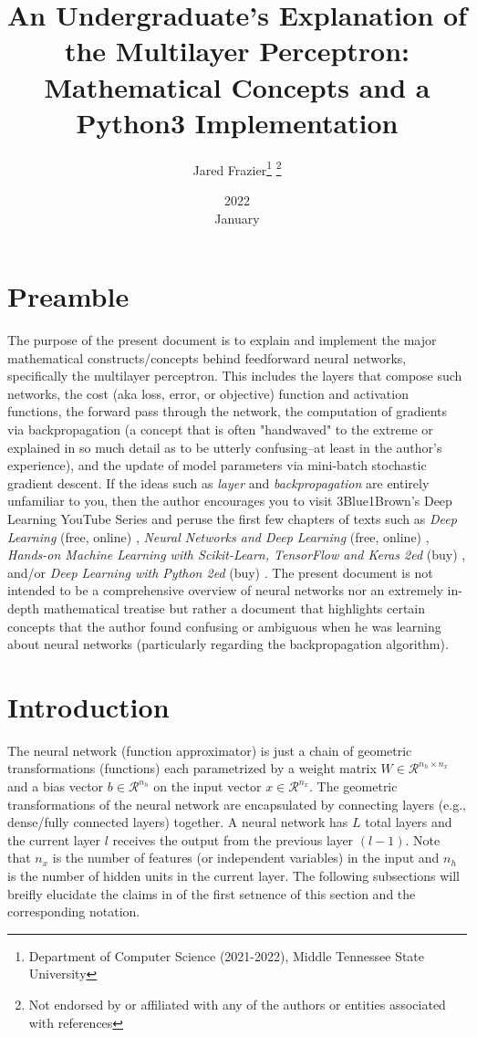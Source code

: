 \documentclass{article}
\title{
	An Undergraduate's Explanation of the Multilayer Perceptron: 
	Mathematical Concepts and a Python3 Implementation}
\date{2022 \\ January}
\author{Jared Frazier\thanks{Department of Computer Science (2021-2022), 
Middle Tennessee State University} \thanks{Not endorsed by or affiliated with any of the 
authors or entities associated with references}}
\begin{document}
\maketitle

\section{Preamble}
\quad The purpose of the present document is to explain and implement the major mathematical
constructs/concepts behind feedforward neural networks, specifically the multilayer perceptron.
This includes the layers that compose such networks, the cost (aka loss, error, or objective) function
and activation functions, the forward pass through the network,
the computation of gradients via backpropagation (a concept that is often "handwaved" to the extreme
or explained in so much detail as to be utterly confusing--at least in the author's experience),
and the update of model parameters via mini-batch stochastic gradient descent.
If the ideas such as \textit{layer} and \textit{backpropagation} are entirely unfamiliar
to you, then the author encourages you to visit 3Blue1Brown's Deep Learning YouTube Series \cite{3Blue1BrownWhatIsANN2017}
and peruse the first few chapters of texts such as \textit{Deep Learning} (free, online) \cite{Goodfellow2016},
\textit{Neural Networks and Deep Learning} (free, online) \cite{Nielsen2015},
\textit{Hands-on Machine Learning with Scikit-Learn, TensorFlow and Keras 2ed} (buy) \cite{Geron2020},
and/or \textit{Deep Learning with Python 2ed} (buy) \cite{Chollet2021}. The present document
is not intended to be a comprehensive overview of neural networks nor an extremely
in-depth mathematical treatise but rather a document that highlights certain concepts that the
author found confusing or ambiguous when he was learning about neural networks
(particularly regarding the backpropagation algorithm).

\section{Introduction}

\quad The neural network (function approximator) is just a chain of geometric transformations (functions)
each parametrized by a weight matrix $W \in \mathcal{R}^{n_h \times n_x}$ and
a bias vector $b \in \mathcal{R}^{n_h}$ on the input vector $x \in \mathcal{R}^{n_x}$.
The geometric transformations of the neural network are encapsulated by connecting
layers (e.g., dense/fully connected layers) together. A neural network has $L$ total
layers and the current layer $l$ receives the output from the previous layer $(l-1)$.
Note that $n_x$ is the number of features (or independent variables) in the input
and $n_h$ is the number of hidden units in the current layer. The following subsections will
breifly elucidate the claims in of the first setnence of this section and the
corresponding notation.
\end{document}
